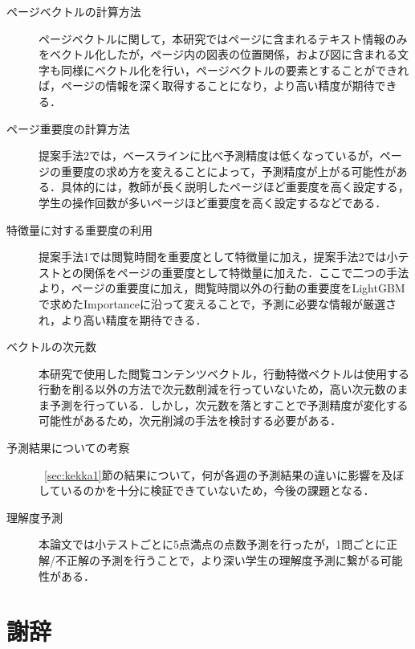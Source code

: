 \documentclass[a4paper,12pt]{ltjsreport}
\begin{document}
\begin{description}

 \item[ページベクトルの計算方法]
ページベクトルに関して，本研究ではページに含まれるテキスト情報のみをベクトル化したが，ページ内の図表の位置関係，および図に含まれる文字も同様にベクトル化を行い，ページベクトルの要素とすることができれば，ページの情報を深く取得することになり，より高い精度が期待できる．

 \item[ページ重要度の計算方法]
提案手法2では，ベースラインに比べ予測精度は低くなっているが，ページの重要度の求め方を変えることによって，予測精度が上がる可能性がある．具体的には，教師が長く説明したページほど重要度を高く設定する，学生の操作回数が多いページほど重要度を高く設定するなどである．

 \item[特徴量に対する重要度の利用]
提案手法1では閲覧時間を重要度として特徴量に加え，提案手法2では小テストとの関係をページの重要度として特徴量に加えた．ここで二つの手法より，ページの重要度に加え，閲覧時間以外の行動の重要度をLightGBMで求めたImportanceに沿って変えることで，予測に必要な情報が厳選され，より高い精度を期待できる．

 \item[ベクトルの次元数]
本研究で使用した閲覧コンテンツベクトル，行動特徴ベクトルは使用する行動を削る以外の方法で次元数削減を行っていないため，高い次元数のまま予測を行っている．しかし，次元数を落とすことで予測精度が変化する可能性があるため，次元削減の手法を検討する必要がある．

 \item[予測結果についての考察]
~\ref{sec:kekka1}節の結果について，何が各週の予測結果の違いに影響を及ぼしているのかを十分に検証できていないため，今後の課題となる．

 \item[理解度予測]
本論文では小テストごとに5点満点の点数予測を行ったが，1問ごとに正解/不正解の予測を行うことで，より深い学生の理解度予測に繋がる可能性がある．


\end{description}


\vspace{2mm}
\chapter*{謝辞}
\end{document}
